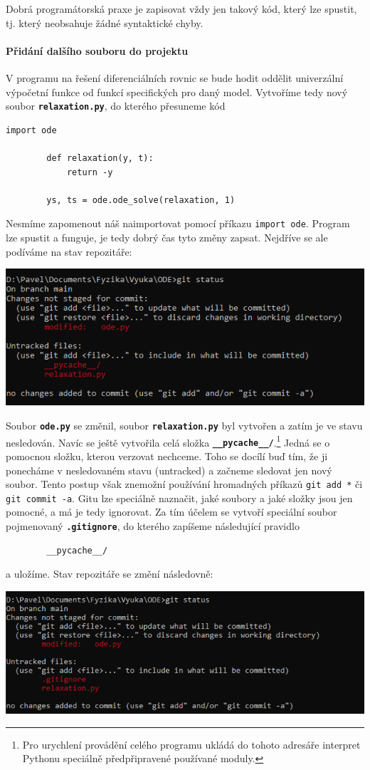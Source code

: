 \documentclass[a4paper,11pt,twoside]{article}
\newcommand{\subsubsubsection}[1]{\paragraph{#1}\mbox{}

}
\def\code#1{\textnormal{\texttt{#1}}}
\def\file#1{\textnormal{\textbf{\texttt{#1}}}}
\theoremstyle{red}
\theoremstyle{green}
\begin{document}
    {\color{blue} Dobrá programátorská praxe je zapisovat vždy jen takový kód, který lze spustit, tj. který neobsahuje žádné syntaktické chyby.}

\subsubsubsection{Přidání dalšího souboru do projektu}
    V programu na řešení diferenciálních rovnic se bude hodit oddělit univerzální výpočetní funkce od funkcí specifických pro daný model.
    Vytvoříme tedy nový soubor \file{relaxation.py}, do kterého přesuneme kód
    \begin{lstlisting}[style=TinyPython]
        import ode

        def relaxation(y, t):
            return -y
        
        ys, ts = ode.ode_solve(relaxation, 1)\end{lstlisting}
    Nesmíme zapomenout náš  naimportovat pomocí příkazu \code{import ode}.
    Program lze spustit a funguje, je tedy dobrý čas tyto změny zapsat.
    Nejdříve se ale podíváme na stav repozitáře:    
    \begin{center}\includegraphics[width=0.7\linewidth]{GitStatusChange2.png}\end{center}
    Soubor \file{ode.py} se změnil, soubor \file{relaxation.py} byl vytvořen a zatím je ve stavu nesledován.
    Navíc se ještě vytvořila celá složka \file{__pycache__/}.\footnote{
        Pro urychlení provádění celého programu ukládá do tohoto adresáře interpret Pythonu speciálně předpřipravené používané moduly.
    }
    Jedná se o pomocnou složku, kterou verzovat nechceme.
    Toho se docílí buď tím, že ji ponecháme v nesledovaném stavu (untracked) a začneme sledovat jen nový soubor.
    Tento postup však znemožní používání hromadných příkazů \code{git add *} či \code{git commit -a}.
    Gitu lze speciálně naznačit, jaké soubory a jaké složky jsou jen pomocné, a má je tedy ignorovat.
    Za tím účelem se vytvoří speciální soubor pojmenovaný \file{.gitignore}, do kterého zapíšeme následující pravidlo
    \begin{lstlisting}
        __pycache__/\end{lstlisting}
    a uložíme.
    Stav repozitáře se změní následovně:
    \begin{center}\includegraphics[width=0.7\linewidth]{GitStatusIgnore.png}\end{center}
\end{document}
